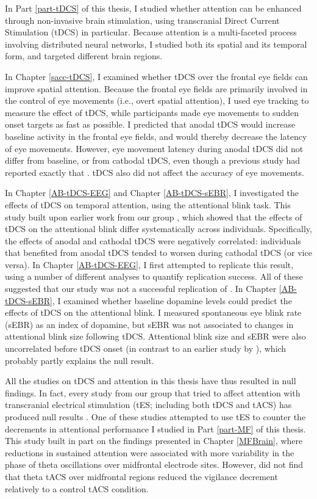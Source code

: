 \documentclass[11pt,]{memoir}
\begin{document}
In Part \ref{part-tDCS} of this thesis, I studied whether attention can be enhanced through non-invasive brain stimulation, using transcranial Direct Current Stimulation (tDCS) in particular. Because attention is a multi-faceted process involving distributed neural networks, I studied both its spatial and its temporal form, and targeted different brain regions.

In Chapter \ref{sacc-tDCS}, I examined whether tDCS over the frontal eye fields can improve spatial attention. Because the frontal eye fields are primarily involved in the control of eye movements (i.e., overt spatial attention), I used eye tracking to measure the effect of tDCS, while participants made eye movements to sudden onset targets as fast as possible. I predicted that anodal tDCS would increase baseline activity in the frontal eye fields, and would thereby decrease the latency of eye movements. However, eye movement latency during anodal tDCS did not differ from baseline, or from cathodal tDCS, even though a previous study had reported exactly that \autocite{Kanai2012}. tDCS also did not affect the accuracy of eye movements.

In Chapter \ref{AB-tDCS-EEG} and Chapter \ref{AB-tDCS-sEBR}, I investigated the effects of tDCS on temporal attention, using the attentional blink task. This study built upon earlier work from our group \autocite{London2015}, which showed that the effects of tDCS on the attentional blink differ systematically across individuals. Specifically, the effects of anodal and cathodal tDCS were negatively correlated: individuals that benefited from anodal tDCS tended to worsen during cathodal tDCS (or vice versa). In Chapter \ref{AB-tDCS-EEG}, I first attempted to replicate this result, using a number of different analyses to quantify replication success. All of these suggested that our study was not a successful replication of \textcite{London2015}. In Chapter \ref{AB-tDCS-sEBR}, I examined whether baseline dopamine levels could predict the effects of tDCS on the attentional blink. I measured spontaneous eye blink rate (sEBR) as an index of dopamine, but sEBR was not associated to changes in attentional blink size following tDCS. Attentional blink size and sEBR were also uncorrelated before tDCS onset (in contrast to an earlier study by \textcite{Colzato2008}), which probably partly explains the null result.

All the studies on tDCS and attention in this thesis have thus resulted in null findings. In fact, every study from our group that tried to affect attention with transcranial electrical stimulation (tES; including both tDCS and tACS) has produced null results \autocites{VanSchouwenburg2019}{VanSchouwenburg2018}. One of these studies \autocite{VanSchouwenburg2019} attempted to use tES to counter the decrements in attentional performance I studied in Part \ref{part-MF} of this thesis. This study built in part on the findings presented in Chapter \ref{MFBrain}, where reductions in sustained attention were associated with more variability in the phase of theta oscillations over midfrontal electrode sites. However, \textcite{VanSchouwenburg2019} did not find that theta tACS over midfrontal regions reduced the vigilance decrement relatively to a control tACS condition.
\end{document}
